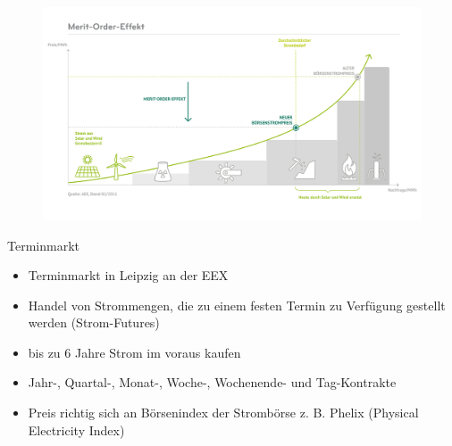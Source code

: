 \documentclass[aspectratio=1610, professionalfonts, 9pt]{beamer}
\begin{document}
{
\begin{frame}
  \begin{figure}
  \includegraphics[width=1\textwidth]{images/Merit.png}
\end{figure}
\end{frame}
}

\begin{frame}{Terminmarkt}
\begin{itemize}
  \item Terminmarkt in Leipzig an der EEX
  \item Handel von Strommengen, die zu einem festen Termin zu Verfügung gestellt werden (Strom-Futures)
  \item bis zu 6 Jahre Strom im voraus kaufen
  \item Jahr-, Quartal-, Monat-, Woche-,  Wochenende- und Tag-Kontrakte
  \item Preis richtig sich an Börsenindex der Strombörse z. B. Phelix (Physical Electricity Index)
\end{itemize}
\end{frame}
\end{document}
